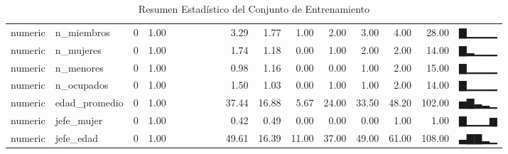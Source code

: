 \begin{table}[ht]
\begin{tabular}{llrrrrrrrrrrrrrrl}
  numeric & n\_miembros &   0 & 1.00 &  &  &  &  &  & 3.29 & 1.77 & 1.00 & 2.00 & 3.00 & 4.00 & 28.00 & ▇▁▁▁▁ \\ 
  numeric & n\_mujeres &   0 & 1.00 &  &  &  &  &  & 1.74 & 1.18 & 0.00 & 1.00 & 2.00 & 2.00 & 14.00 & ▇▂▁▁▁ \\ 
  numeric & n\_menores &   0 & 1.00 &  &  &  &  &  & 0.98 & 1.16 & 0.00 & 0.00 & 1.00 & 2.00 & 15.00 & ▇▁▁▁▁ \\ 
  numeric & n\_ocupados &   0 & 1.00 &  &  &  &  &  & 1.50 & 1.03 & 0.00 & 1.00 & 1.00 & 2.00 & 14.00 & ▇▁▁▁▁ \\ 
  numeric & edad\_promedio &   0 & 1.00 &  &  &  &  &  & 37.44 & 16.88 & 5.67 & 24.00 & 33.50 & 48.20 & 102.00 & ▅▇▃▂▁ \\ 
  numeric & jefe\_mujer &   0 & 1.00 &  &  &  &  &  & 0.42 & 0.49 & 0.00 & 0.00 & 0.00 & 1.00 & 1.00 & ▇▁▁▁▆ \\ 
  numeric & jefe\_edad &   0 & 1.00 &  &  &  &  &  & 49.61 & 16.39 & 11.00 & 37.00 & 49.00 & 61.00 & 108.00 & ▃▇▇▂▁ \\ 
   \bottomrule
\end{tabular}
\caption{Resumen Estadístico del Conjunto de Entrenamiento} 
\label{tab:train_summary}
\end{table}
